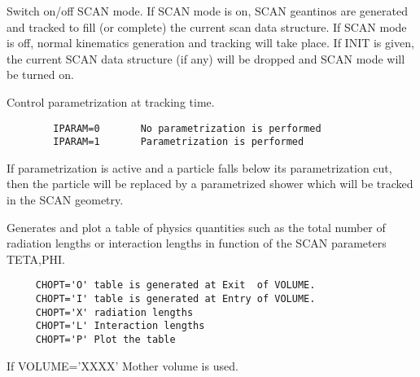 \ENDCMD


\BEGARG
{}
\ENDARG
{}
\ENDOPT

   \par
Switch on/off SCAN mode. If SCAN mode is on, SCAN geantinos are generated 
   and tracked to fill (or complete) the current scan data structure. If SCAN 
   mode is off, normal kinematics generation and tracking will take place. If 
   INIT is given, the current SCAN data structure (if any) will be dropped and 
   SCAN mode will be turned on.  

\ENDCMD


\BEGARG
{}
\ENDARG

   \par
Control parametrization at tracking time.  
\begin{verbatim}
        IPARAM=0       No parametrization is performed
        IPARAM=1       Parametrization is performed
\end{verbatim}
   \par
If parametrization is active and a particle falls below its parametrization 
   cut, then the particle will be replaced by a parametrized shower which will 
   be tracked in the SCAN geometry.  

\ENDCMD


\BEGARG
{}
\ENDARG
{}
\DEFOPT{\EMPTY}{}
\ENDOPT

   \par
Generates and plot a table of physics quantities such as the total number 
   of radiation lengths or interaction lengths in function of the SCAN 
   parameters TETA,PHI.  
\begin{verbatim}
     CHOPT='O' table is generated at Exit  of VOLUME.
     CHOPT='I' table is generated at Entry of VOLUME.
     CHOPT='X' radiation lengths
     CHOPT='L' Interaction lengths
     CHOPT='P' Plot the table
\end{verbatim}
   \par
If VOLUME='XXXX' Mother volume is used.  

